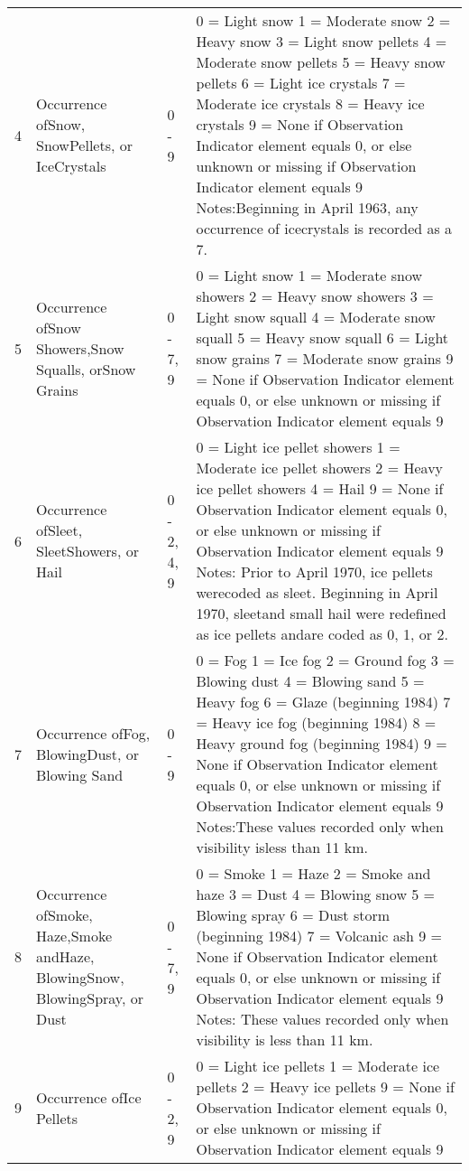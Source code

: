 \begin{longtable}[c]{p{1.5in}p{1.5in}p{1.5in}p{1.5in}}
4 & Occurrence ofSnow, SnowPellets, or IceCrystals & 0 - 9 & 0 = Light snow   
    1 = Moderate snow   
    2 = Heavy snow   
    3 = Light snow pellets   
    4 = Moderate snow pellets   
    5 = Heavy snow pellets   
    6 = Light ice crystals   
    7 = Moderate ice crystals   
    8 = Heavy ice crystals   
    9 = None if Observation Indicator element equals 0, or else unknown or missing if Observation Indicator element equals 9    
    Notes:Beginning in April 1963, any occurrence of icecrystals is recorded as a 7. \tabularnewline
5 & Occurrence ofSnow Showers,Snow Squalls, orSnow Grains & 0 - 7, 9 & 0 = Light snow   
    1 = Moderate snow showers   
    2 = Heavy snow showers   
    3 = Light snow squall   
    4 = Moderate snow squall   
    5 = Heavy snow squall   
    6 = Light snow grains   
    7 = Moderate snow grains   
    9 = None if Observation Indicator element equals 0, or else unknown or missing if Observation Indicator element equals 9 \tabularnewline
6 & Occurrence ofSleet, SleetShowers, or Hail & 0 - 2, 4, 9 & 0 = Light ice pellet showers   
    1 = Moderate ice pellet showers   
    2 = Heavy ice pellet showers   
    4 = Hail   
    9 = None if Observation Indicator element equals 0, or else unknown or missing if Observation Indicator element equals 9   
    Notes: Prior to April 1970, ice pellets werecoded as sleet. Beginning in April 1970, sleetand small hail were redefined as ice pellets andare coded as 0, 1, or 2. \tabularnewline
7 & Occurrence ofFog, BlowingDust, or Blowing Sand & 0 - 9 & 0 = Fog   
    1 = Ice fog   
    2 = Ground fog   
    3 = Blowing dust   
    4 = Blowing sand   
    5 = Heavy fog   
    6 = Glaze (beginning 1984)   
    7 = Heavy ice fog (beginning 1984)   
    8 = Heavy ground fog (beginning 1984)   
    9 = None if Observation Indicator element equals 0, or else unknown or missing if Observation Indicator element equals 9   
    Notes:These values recorded only when visibility isless than 11 km. \tabularnewline
8 & Occurrence ofSmoke, Haze,Smoke andHaze, BlowingSnow, BlowingSpray, or Dust & 0 - 7, 9 & 0 = Smoke   
    1 = Haze   
    2 = Smoke and haze   
    3 = Dust   
    4 = Blowing snow   
    5 = Blowing spray   
    6 = Dust storm (beginning 1984)   
    7 = Volcanic ash   
    9 = None if Observation Indicator element equals 0, or else unknown or missing if Observation Indicator element equals 9   
    Notes: These values recorded only when visibility is less than 11 km. \tabularnewline
9 & Occurrence ofIce Pellets & 0 - 2, 9 & 0 = Light ice pellets   
    1 = Moderate ice pellets   
    2 = Heavy ice pellets   
    9 = None if Observation Indicator element equals 0, or else unknown or missing if Observation Indicator element equals 9 \tabularnewline
\bottomrule
\end{longtable}

